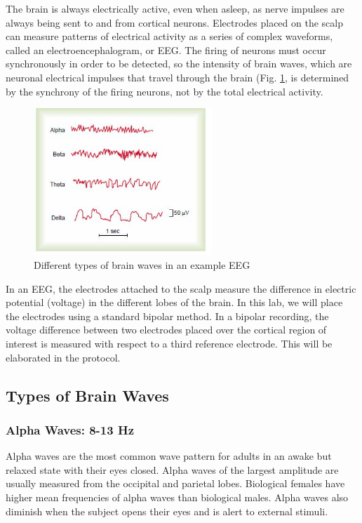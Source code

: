 \documentclass{article}
\begin{document}
The brain is always electrically active, even when asleep, as nerve impulses are always being sent to and from cortical neurons. Electrodes placed on the scalp can measure patterns of electrical activity as a series of complex waveforms, called an electroencephalogram, or EEG. The firing of neurons must occur synchronously in order to be detected, so the intensity of brain waves, which are neuronal electrical impulses that travel through the brain (Fig. \ref{brainwaves}, is determined by the synchrony of the firing neurons, not by the total electrical activity.

\begin{figure}[h]
\centering
\includegraphics[width=0.6\textwidth]{../images/EEG_2.jpg}	
\caption{Different types of brain waves in an example EEG}
\label{brainwaves}
\end{figure}

In an EEG, the electrodes attached to the scalp measure the difference in electric potential (voltage) in the different lobes of the brain. In this lab, we will place the electrodes using a standard bipolar method. In a bipolar recording, the voltage difference between two electrodes placed over the cortical region of interest is measured with respect to a third reference electrode. This will be elaborated in the protocol.

\subsection*{Types of Brain Waves}
\subsubsection*{Alpha Waves: 8-13 Hz}
Alpha waves are the most common wave pattern for adults in an awake but relaxed state with their eyes closed. Alpha waves of the largest amplitude are usually measured from the occipital and parietal lobes. Biological females have higher mean frequencies of alpha waves than biological males. Alpha waves also diminish when the subject opens their eyes and is alert to external stimuli.
\end{document}
